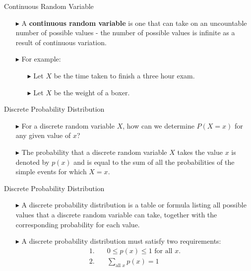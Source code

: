 \documentclass[12pt]{beamer}
\begin{document}
\begin{frame}{Continuous Random Variable}
	
	\begin{itemize}
		\item[\color{blue}$\blacktriangleright$] A \textbf{continuous random variable} is one that can take on an uncountable number of possible values - the number of possible values is infinite as a result of continuous variation.
		
		\item[\color{blue}$\blacktriangleright$] For example:
		\begin{itemize}
			\item[\color{blue}$\blacktriangleright$] Let $X$ be the time taken to finish a three hour exam.
			\item[\color{blue}$\blacktriangleright$] Let $X$ be the weight of a boxer.
		\end{itemize}
	\end{itemize}
	
\end{frame}

\begin{frame}{Discrete Probability Distribution}
	
	\begin{itemize}
		\item[\color{blue}$\blacktriangleright$] For a discrete random variable $X$, how can we determine $P(X = x)$ for any given value of $x$?
		
		\item[\color{blue}$\blacktriangleright$] The probability that a discrete random variable $X$ takes the value $x$ is denoted by $p(x)$ and is equal to the sum of all the probabilities of the simple events for which $X = x$.
	\end{itemize}
	
\end{frame}

\begin{frame}{Discrete Probability Distribution}
\begin{itemize}
	\item[\color{blue}$\blacktriangleright$] A discrete probability distribution is a table or formula listing all possible values that a discrete random variable can take, together with the corresponding probability for each value.
	
	\item[\color{blue}$\blacktriangleright$] A discrete probability distribution must satisfy two requirements:
	\begin{align*}
		1. & \quad 0 \leq p(x) \leq 1 \text{ for all } x. \\
		2. & \quad \sum_{\text{all } x} p(x) = 1
	\end{align*}
\end{itemize}
\end{frame}
\end{document}
